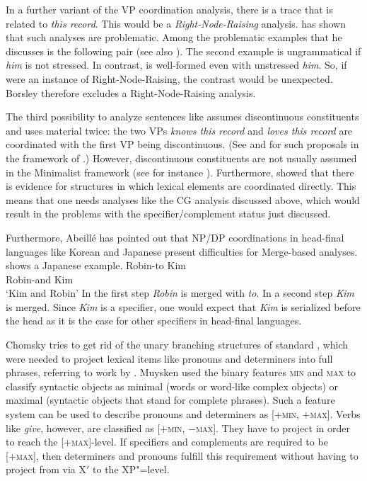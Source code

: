 In a further variant of the VP coordination analysis, there is a trace that is related to 
\emph{this record}. This would be a \emph{Right-Node-Raising} analysis. \citet{Borsley2005a} has shown
that such analyses are problematic. Among the problematic examples that he discusses is the
following pair  (see also \citealp[]{Bresnan74a-u}).
\eal
{}
\zl
The second example is ungrammatical if \emph{him} is not stressed. In contrast,  is
well-formed even with unstressed \emph{him}. So, if  were an instance of
Right-Node-Raising, the contrast would be unexpected. Borsley therefore excludes a
Right-Node-Raising analysis.


The third possibility to analyze sentences like  assumes
discontinuous constituents and uses material twice: the two VPs \emph{knows this record} and \emph{loves this record} are coordinated with the first VP being
discontinuous. (See  and  for such proposals in the framework of \hpsg.)
However, discontinuous constituents are not usually assumed in the Minimalist framework (see for
instance ). Furthermore, \citet{Abeille2006a} showed that there is evidence for structures in
which lexical elements are coordinated directly. This means that one needs analyses like the CG
analysis discussed above, which would result in the problems with the specifier/complement
status just discussed. 

Furthermore, Abeillé has pointed out that NP/DP coordinations in head-final languages like Korean and
Japanese present difficulties for Merge-based analyses.  shows a Japanese example.
\ea
\label{coordination-head-final}
\gll Robin-to Kim\\
     Robin-and Kim\\
\glt `Kim and Robin'
\z
In the first step \emph{Robin} is merged with \emph{to}. In a second step \emph{Kim} is
merged. Since \emph{Kim} is a specifier, one would expect that \emph{Kim} is serialized before the
head as it is the case for other specifiers in head-final languages.

Chomsky tries to get rid of the unary branching structures of standard \xbart, which were needed to
project lexical items like pronouns and determiners into full phrases, referring to work by
\citet{Muysken82a}. Muysken used the binary features \textsc{min} and \textsc{max} to classify syntactic
objects as minimal (words or word-like complex objects) or maximal (syntactic objects that stand for
complete phrases). Such a feature system can be used to describe pronouns and determiners as
[+\textsc{min}, $+$\textsc{max}]. Verbs like \emph{give}, however, are classified as [+\textsc{min},
  $-$\textsc{max}]. They have to project in order to reach the [+\textsc{max}]-level. If specifiers
and complements are required to be [+\textsc{max}], then determiners and pronouns fulfill this requirement
without having to project from \xzero via X$'$ to the XP"=level.

